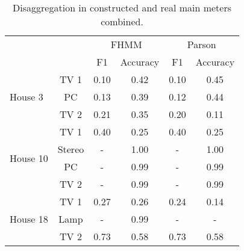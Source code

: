 \begin{table}[H]                             
\centering                                   
\begin{tabular}{lc|c|c|c|c|}
\cline{3-6}
                                                &        & \multicolumn{2}{c|}{FHMM} & \multicolumn{2}{c|}{Parson} \\ \cline{3-6} 
                                                &        & F1        & Accuracy      & F1         & Accuracy       \\ \hline
\multicolumn{1}{|l|}{\multirow{3}{*}{House 3}}  & TV 1   & 0.10      & 0.42          & 0.10       & 0.45           \\ \cline{2-6} 
\multicolumn{1}{|l|}{}                          & PC     & 0.13      & 0.39          & 0.12       & 0.44           \\ \cline{2-6} 
\multicolumn{1}{|l|}{}                          & TV 2   & 0.21      & 0.35          & 0.20       & 0.11           \\ \hline
\multicolumn{1}{|l|}{\multirow{4}{*}{House 10}} & TV 1   & 0.40      & 0.25          & 0.40       & 0.25           \\ \cline{2-6} 
\multicolumn{1}{|l|}{}                          & Stereo & -         & 1.00          & -          & 1.00           \\ \cline{2-6} 
\multicolumn{1}{|l|}{}                          & PC     & -         & 0.99          & -          & 0.99           \\ \cline{2-6} 
\multicolumn{1}{|l|}{}                          & TV 2   & -         & 0.99          & -          & 0.99           \\ \hline
\multicolumn{1}{|l|}{\multirow{3}{*}{House 18}} & TV 1   & 0.27      & 0.26          & 0.24       & 0.14           \\ \cline{2-6} 
\multicolumn{1}{|l|}{}                          & Lamp   & -         & 0.99          & -          & -              \\ \cline{2-6} 
\multicolumn{1}{|l|}{}                          & TV 2   & 0.73      & 0.58          & 0.73       & 0.58           \\ \hline
\end{tabular}                              
\caption{Disaggregation in constructed and real main meters combined.}                     
\label{table:Tab:SHGSIMREAL}                 
\end{table}     